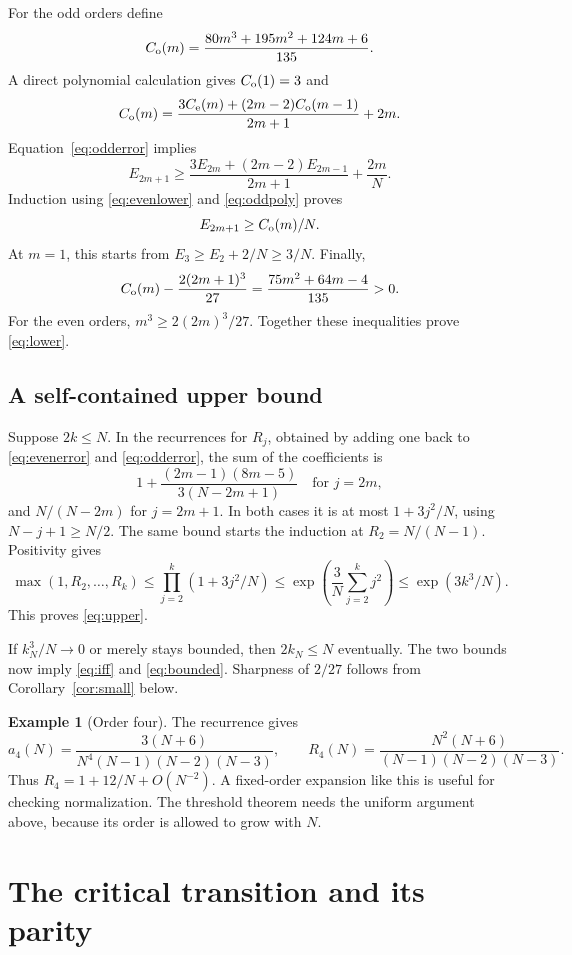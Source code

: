 \documentclass[11pt]{article}
\theoremstyle{definition}
\newtheorem{example}[theorem]{Example}
\theoremstyle{remark}
\newcommand{\1}{\mathbf 1}
\begin{document}
For the odd orders define
\[
C_{\rm o}(m)=\frac{80m^3+195m^2+124m+6}{135}.
\]
A direct polynomial calculation gives $C_{\rm o}(1)=3$ and
\begin{equation}\label{eq:oddpoly}
C_{\rm o}(m)=\frac{3C_{\rm e}(m)+(2m-2)C_{\rm o}(m-1)}{2m+1}+2m.
\end{equation}
Equation~\eqref{eq:odderror} implies
\[
E_{2m+1}\ge\frac{3E_{2m}+(2m-2)E_{2m-1}}{2m+1}+\frac{2m}N.
\]
Induction using \eqref{eq:evenlower} and \eqref{eq:oddpoly} proves
\begin{equation}\label{eq:oddlower}
E_{2m+1}\ge C_{\rm o}(m)/N.
\end{equation}
At $m=1$, this starts from $E_3\ge E_2+2/N\ge3/N$. Finally,
\[
C_{\rm o}(m)-\frac{2(2m+1)^3}{27}
=\frac{75m^2+64m-4}{135}>0.
\]
For the even orders, $m^3\ge2(2m)^3/27$. Together these inequalities prove \eqref{eq:lower}.

\subsection{A self-contained upper bound}

Suppose $2k\le N$. In the recurrences for $R_j$, obtained by adding one back to \eqref{eq:evenerror} and \eqref{eq:odderror}, the sum of the coefficients is
\[
1+\frac{(2m-1)(8m-5)}{3(N-2m+1)}
\quad\text{for }j=2m,
\]
and $N/(N-2m)$ for $j=2m+1$. In both cases it is at most $1+3j^2/N$, using $N-j+1\ge N/2$. The same bound starts the induction at $R_2=N/(N-1)$. Positivity gives
\[
\max(1,R_2,\ldots,R_k)
\le\prod_{j=2}^k(1+3j^2/N)
\le\exp\left(\frac3N\sum_{j=2}^k j^2\right)
\le\exp(3k^3/N).
\]
This proves \eqref{eq:upper}.

If $k_N^3/N\to0$ or merely stays bounded, then $2k_N\le N$ eventually. The two bounds now imply \eqref{eq:iff} and \eqref{eq:bounded}. Sharpness of $2/27$ follows from Corollary~\ref{cor:small} below.

\begin{example}[Order four]
The recurrence gives
\[
a_4(N)=\frac{3(N+6)}{N^4(N-1)(N-2)(N-3)},\qquad
R_4(N)=\frac{N^2(N+6)}{(N-1)(N-2)(N-3)}.
\]
Thus $R_4=1+12/N+O(N^{-2})$. A fixed-order expansion like this is useful for checking normalization. The threshold theorem needs the uniform argument above, because its order is allowed to grow with $N$.
\end{example}


\section{The critical transition and its parity}\label{sec:critical}
\end{document}
